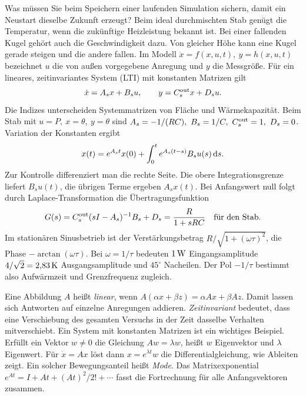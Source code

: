 Was müssen Sie beim Speichern einer laufenden Simulation sichern, damit ein Neustart dieselbe Zukunft erzeugt? Beim ideal durchmischten Stab genügt die Temperatur, wenn die zukünftige Heizleistung bekannt ist. Bei einer fallenden Kugel gehört auch die Geschwindigkeit dazu. Von gleicher Höhe kann eine Kugel gerade steigen und die andere fallen.
Im Modell \(\dot x=f(x,u,t),\ y=h(x,u,t)\) bezeichnet \(u\) die von außen vorgegebene Anregung und \(y\) die Messgröße. Für ein lineares, zeitinvariantes System (LTI) mit konstanten Matrizen gilt
\[
 \dot x=A_sx+B_su,\qquad y=C_s^{\rm out}x+D_s u .
\]
Die Indizes unterscheiden Systemmatrizen von Fläche und Wärmekapazität. Beim Stab mit \(u=P,\ x=\theta,\ y=\theta\) sind \(A_s=-1/(RC),\ B_s=1/C,\ C_s^{\rm out}=1,\ D_s=0\).
Variation der Konstanten ergibt
\[
 x(t)=e^{A_st}x(0)+\int_0^t e^{A_s(t-s)} B_su(s)\,\mathrm{d} s .
\]
Zur Kontrolle differenziert man die rechte Seite. Die obere Integrationsgrenze liefert \(B_su(t)\), die übrigen Terme ergeben \(A_sx(t)\). Bei Anfangswert null folgt durch Laplace-Transformation die Übertragungsfunktion
\[
 G(s)=C_s^{\rm out}(sI-A_s)^{-1}B_s+D_s=\frac{R}{1+sRC}
 \quad\text{für den Stab.}
\]
Im stationären Sinusbetrieb ist der Verstärkungsbetrag \(R/\sqrt{1+(\omega\tau)^2}\), die Phase \(-\arctan(\omega\tau)\). Bei \(\omega=1/\tau\) bedeuten \(1\,\mathrm{W}\) Eingangsamplitude \(4/\sqrt 2=2{,}83\,\mathrm{K}\) Ausgangsamplitude und \(45^\circ\) Nacheilen. Der Pol \(-1/\tau\) bestimmt also Aufwärmzeit und Grenzfrequenz zugleich.

Eine Abbildung \(A\) heißt \emph{linear}, wenn \(A(\alpha x+\beta z)=\alpha A x+\beta A z\). Damit lassen sich Antworten auf einzelne Anregungen addieren. \emph{Zeitinvariant} bedeutet, dass eine Verschiebung des gesamten Versuchs in der Zeit dasselbe Verhalten mitverschiebt. Ein System mit konstanten Matrizen ist ein wichtiges Beispiel.
Erfüllt ein Vektor \(w\ne0\) die Gleichung \(Aw=\lambda w\), heißt \(w\) Eigenvektor und \(\lambda\) Eigenwert. Für \(\dot x=Ax\) löst dann \(x=e^{\lambda t}w\) die Differentialgleichung, wie Ableiten zeigt. Ein solcher Bewegungsanteil heißt \emph{Mode}. Das Matrixexponential \(e^{At}=I+At+(At)^2/2!+\cdots\) fasst die Fortrechnung für alle Anfangsvektoren zusammen.

